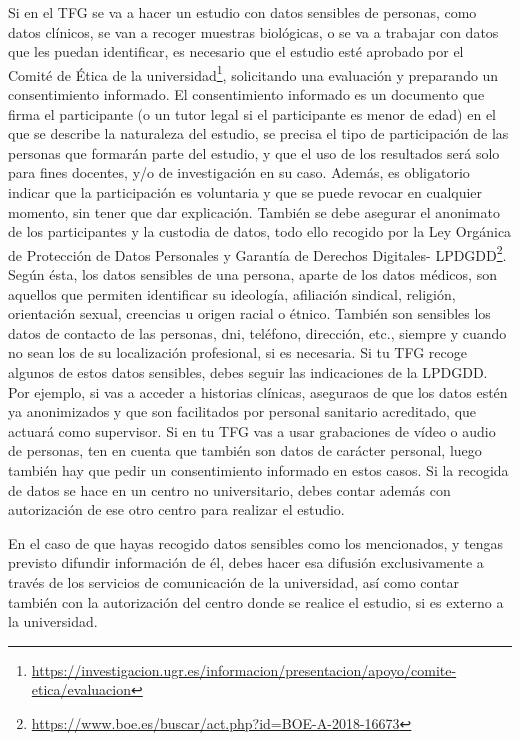 Si en el TFG se va a hacer un estudio con datos sensibles de personas, como datos clínicos, se van a recoger muestras biológicas, o se va a trabajar con datos que les puedan identificar, es necesario que el estudio esté aprobado por el {Comité de Ética de la universidad}\footnote{\url{https://investigacion.ugr.es/informacion/presentacion/apoyo/comite-etica/evaluacion}}, solicitando una evaluación y preparando un consentimiento informado. El consentimiento informado es un documento que firma el participante (o un tutor legal si el participante es menor de edad) en el que se describe la naturaleza del estudio, se precisa el tipo de participación de las personas que formarán parte del estudio, y que el uso de los resultados será solo para fines docentes, y/o de investigación en su caso. Además, es obligatorio indicar que la participación es voluntaria y que se puede revocar en cualquier momento, sin tener que dar explicación. También se debe asegurar el anonimato de los participantes y la custodia de datos, todo ello recogido por la {Ley Orgánica de Protección de Datos Personales y Garantía de Derechos Digitales- LPDGDD}\footnote{\url{https://www.boe.es/buscar/act.php?id=BOE-A-2018-16673}}. Según ésta, los datos sensibles de una persona, aparte de los datos médicos, son aquellos que permiten identificar su ideología, afiliación sindical, religión, orientación sexual, creencias u origen racial o étnico. También son sensibles los datos de contacto de las personas, dni, teléfono, dirección, etc., siempre y cuando no sean los de su localización profesional, si es necesaria. Si tu TFG recoge algunos de estos datos sensibles, debes seguir las indicaciones de la LPDGDD. Por ejemplo, si vas a acceder a historias clínicas, aseguraos de que los datos estén ya anonimizados y que son facilitados por personal sanitario acreditado, que actuará como supervisor. Si en tu TFG vas a usar grabaciones de vídeo o audio de personas, ten en cuenta que también son datos de carácter personal, luego también hay que pedir un consentimiento informado en estos casos. Si la recogida de datos se hace en un centro no universitario, debes contar además con autorización de ese otro centro para realizar el estudio.

En el caso de que hayas recogido datos sensibles como los mencionados, y tengas previsto difundir información de él, debes hacer esa difusión exclusivamente a través de los servicios de comunicación de la universidad, así como contar también con la autorización del centro donde se realice el estudio, si es externo a la universidad.

